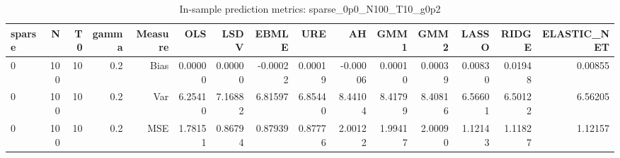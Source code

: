 \begin{table}[!htbp]\centering
\caption{In-sample prediction metrics: sparse_0p0_N100_T10_g0p2}
\label{tab:table2_sparse_0p0_N100_T10_g0p2}
\begin{tabular}{lrrrrrrrrrrrrrr}
\hline
sparse & N & T0 & gamma & Measure & OLS & LSDV & EBMLE & URE & AH & GMM1 & GMM2 & LASSO & RIDGE & ELASTIC_NET \\
\hline
0 & 100 & 10 & 0.2 & Bias & 0.00000 & 0.00000 & -0.00022 & 0.00019 & -0.00006 & 0.00010 & 0.00039 & 0.00830 & 0.01948 & 0.00855 \\
0 & 100 & 10 & 0.2 & Var & 6.25410 & 7.16882 & 6.81597 & 6.85440 & 8.44104 & 8.41799 & 8.40816 & 6.56601 & 6.50122 & 6.56205 \\
0 & 100 & 10 & 0.2 & MSE & 1.78151 & 0.86794 & 0.87939 & 0.87776 & 2.00122 & 1.99417 & 2.00090 & 1.12143 & 1.11827 & 1.12157 \\
\hline
\end{tabular}
\end{table}

